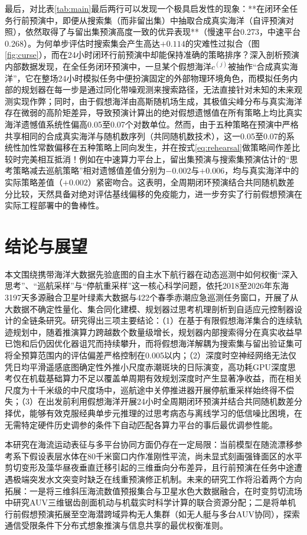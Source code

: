 最后，对比表\ref{tab:main}最后两行可以发现一个极具启发性的现象：**在闭环全任务行前预演中，即便从搜索集（而非留出集）中抽取合成真实海洋（自评预演对照），依然取得了与留出集预演高度一致的优异表现**（慢速平台0.273，中速平台0.268）。为何单步评估时搜索集会产生高达$+0.114$的灾难性过拟合（图\ref{fig:curse}），而在24小时闭环行前预演中却能保持准确的策略排序？深入剖析预演内部数据发现，在全任务闭环预演中，一旦某个假想海洋$c^{(j)}$被抽作“合成真实海洋”，它在整场24小时模拟任务中便扮演固定的外部物理环境角色，而模拟任务内部的规划器在每一步是通过同化带噪观测来搜索路径，无法直接针对未知的未来观测实现作弊；同时，由于假想海洋由高斯随机场生成，其极值尖峰分布与真实海洋存在微弱的高阶矩差异，导致预演计算出的绝对假想遗憾值在所有策略上均比真实海洋遗憾值系统性偏高0.05至0.07个对数单位。然而，由于五种策略在预演中严格共享相同的合成真实海洋与随机数序列（共同随机数技术），这一0.05至0.07的系统性加性常数偏移在五种策略上同向发生，并在按式\eqref{eq:rehearsal}做策略间作差比较时完美相互抵消！例如在中速算力平台上，留出集预演与搜索集预演估计的“思考策略减去巡航策略”相对遗憾值差值分别为$-0.002$与$+0.006$，均与真实海洋中的实际策略差值（$+0.002$）紧密吻合。这表明，全周期闭环预演结合共同随机数差分比较，天然具备对绝对评估基线偏移的免疫能力，进一步夯实了行前假想预演在实际工程部署中的鲁棒性。

\section{结论与展望}

本文围绕携带海洋大数据先验底图的自主水下航行器在动态巡测中如何权衡“深入思考”、“巡航采样”与“停航重采样”这一核心科学问题，依托2018至2026年东海3197天多源融合卫星叶绿素大数据与422个春季赤潮应急巡测任务窗口，开展了从大数据不确定性量化、集合同化建模、规划器过思考机理剖析到自适应元控制器设计的全链条研究。研究得出三项主要结论：（1）在基于有限假想海洋集合的连续轨迹规划中，随着推演算力跨越数个数量级增长，规划器内部搜索得分在真实收益早已饱和后仍因优化器诅咒而持续攀升，而将假想海洋解耦为搜索集与留出验证集可将全预算范围内的评估偏差严格控制在0.005以内；（2）深度时空神经网络无法仅凭日均平滑遥感底图确定性外推小尺度赤潮斑块的日际演变，高功耗GPU深度思考仅在机载基础算力不足以覆盖单周期有效规划深度时产生显著净收益，而在相关尺度为十千米级的中尺度场中，巡航途中关停推进器开展停航重采样始终得不偿失；（3）在出发前利用假想海洋开展24小时全周期闭环预演并结合共同随机数差分择优，能够有效克服经典单步元推理的过思考病态与离线学习的低信噪比困境，在无需特定硬件历史调参的条件下自动匹配各算力平台的事后最优调参性能。

本研究在海流运动表征与多平台协同方面仍存在一定局限：当前模型在随流漂移参考系下假设表层水体在80千米窗口内作准刚性平流，尚未显式刻画强锋面区的水平剪切变形及藻华昼夜垂直迁移引起的三维垂向分布差异，且行前预演在任务中途遭遇极端突发水文突变时缺乏在线重预演修正机制。未来的研究工作将沿着两个方向拓展：一是将三维斜压海流数值预报集合与卫星水色大数据融合，在时变剪切流场中研究AUV三维锯齿剖面机动与机载实时科学计算的联合资源分配；二是将单机行前假想预演拓展至空海潜跨域异构无人集群（如无人艇与多台AUV协同），探索通信受限条件下分布式想象推演与信息共享的最优权衡准则。
